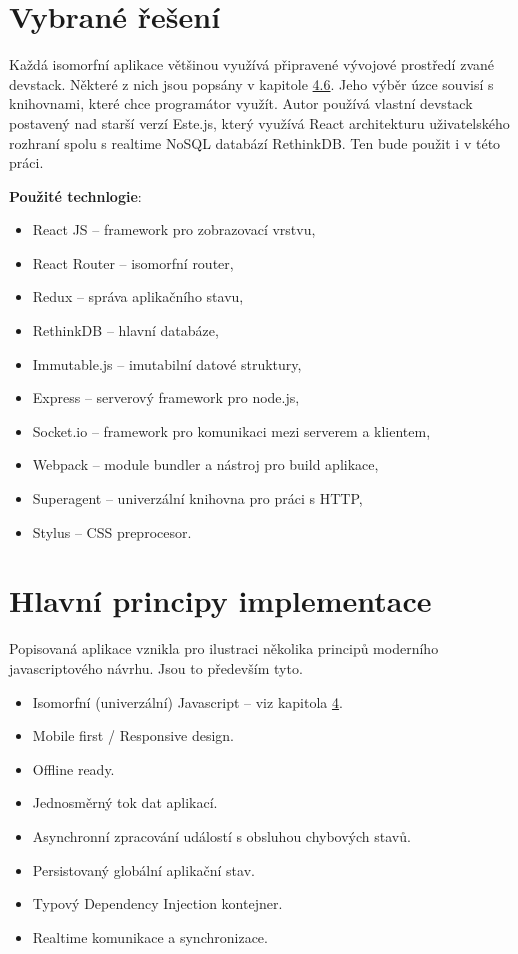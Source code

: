 \section{Vybrané řešení}
Každá isomorfní aplikace většinou využívá připravené vývojové prostředí zvané devstack. Některé z nich jsou popsány v kapitole \hyperref[sec:devstacks]{4.6}. Jeho výběr úzce souvisí s knihovnami, které chce programátor využít. Autor používá vlastní devstack postavený nad starší verzí Este.js, který využívá React architekturu uživatelského rozhraní spolu s realtime NoSQL databází RethinkDB. Ten bude použit i v této práci.

\vspace{3mm}
\noindent \textbf{Použité technlogie}:
\begin{itemize}
\item React	JS – framework pro zobrazovací vrstvu,
\item React Router – isomorfní router,
\item Redux – správa aplikačního stavu,
\item RethinkDB	 – hlavní databáze,
\item Immutable.js – imutabilní datové struktury,
\item Express	– serverový framework pro node.js,
\item Socket.io – framework pro komunikaci mezi serverem a klientem,
\item Webpack – module bundler a nástroj pro build aplikace,
\item Superagent – univerzální knihovna pro práci s HTTP,
\item Stylus – CSS preprocesor.
\end{itemize}

\section{Hlavní principy implementace}
Popisovaná aplikace vznikla pro ilustraci několika principů moderního javascriptového návrhu. Jsou to především tyto.
\begin{itemize}
\item Isomorfní (univerzální) Javascript – viz kapitola \hyperref[sec:isomorphic]{4}.
\item Mobile first / Responsive design.
\item Offline ready.
\item Jednosměrný tok dat aplikací.
\item Asynchronní zpracování událostí s obsluhou chybových stavů.
\item Persistovaný globální aplikační stav.
\item Typový Dependency Injection kontejner.
\item Realtime komunikace a synchronizace.
\end{itemize}

